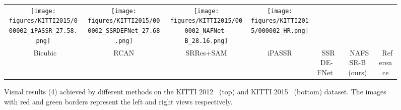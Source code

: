 \documentclass[10pt,twocolumn,letterpaper]{article}
\begin{document}
\begin{figure*}[!t]
\begin{center}
{\begin{tabular}[b]{c@{ } c@{ } c@{ }  c@{ } c@{ } c@{ } c@{ } }
    \texttt{[image: figures/KITTI2015/000002\_iPASSR\_27.58.png]} &
    \texttt{[image: figures/KITTI2015/000002\_SSRDEFNet\_27.68.png]} &
    \texttt{[image: figures/KITTI2015/000002\_NAFNet-B\_28.16.png]} &
    \texttt{[image: figures/KITTI2015/000002\_HR.png]} \\
    \scriptsize~Bicubic    &
\scriptsize~RCAN~\cite{zhang2018image} &
\scriptsize~SRRes+SAM~\cite{ying2020stereo} &\scriptsize~iPASSR~\cite{wang2021symmetric} &\scriptsize~SSRDE-FNet~\cite{dai2021feedback} &\scriptsize~NAFSSR-B (ours)  & \scriptsize~Reference\\
\end{tabular}}
\end{center}
\vspace{-7mm}
\caption{Visual results (4) achieved by different methods on the KITTI 2012~\cite{geiger2012we} (top) and KITTI 2015~\cite{menze2015object} (bottom) dataset. The images with red and green borders represent the left and right views respectively.
}
\label{fig:kitti}
\vspace{-3mm}
\end{figure*}
\end{document}
